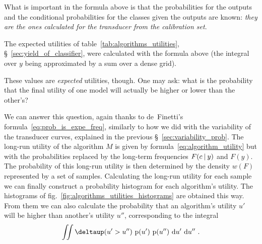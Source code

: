 \documentclass[\ifafour a4paper,12pt,\else a5paper,10pt,\fi%
onecolumn,oneside,article,%
british%
]{memoir}
\makeatletter
\newcommand*{\widefbox}[1]{\fbox{\hspace{1em}#1\hspace{1em}}}
\theoremstyle{remark}
\theoremstyle{innote}
\def\sum{\DOTSI\sumop\slimits@}
\newcommand*{\de}{\partialup}%
\newcommand*{\delt}{\deltaup}%
\newcommand*{\di}{\mathrm{d}}%
\newcommand*{\p}{\mathrm{p}}%
\renewcommand*{\|}[1][]{\nonscript\:#1\vert\nonscript\:\mathopen{}}
\newcommand*{\sect}{\S}%
\newcommand*{\fig}{fig.}%
\newcommand*{\tsum}{\mathop{\textstyle\sum}\nolimits}
\newcommand*{\wf}{w}
\makeatother
\begin{document}
What is important in the formula above is that the probabilities for the outputs and the conditional probabilities for the classes given the outputs are known: \emph{they are the ones calculated for the transducer from the calibration set}.

The expected utilities of table~\ref{tab:algorithms_utilities}, \sect~\ref{sec:yield_of_classifier}, were calculated with the formula above (the integral over $y$ being approximated by a sum over a dense grid).

\medskip

These values are \emph{expected} utilities, though. One may ask: what is the probability that the final utility of one model will actually be higher or lower than the other's?

We can answer this question, again thanks to de~Finetti's formula~\eqref{eq:prob_is_expe_freq}, similarly to how we did with the variability of the transducer curves, explained in the previous \sect~\ref{sec:variability_prob}. The long-run utility of the algorithm $M$ is given by formula~\eqref{eq:algorithm_utility} but with the probabilities replaced by the long-term frequencies $F(c\|y)$ and $F(y)$. The probability of this long-run utility is then determined by the density $\wf(F)$ represented by a set of samples. Calculating the long-run utility for each sample we can finally construct a probability histogram for each algorithm's utility. The histograms of \fig~\ref{fig:algorithms_utilities_histograms} are obtained this way. From them we can also calculate the probability that an algorithm's utility $u'$ will be higher than another's utility $u''$, corresponding to the integral
\begin{equation}
  \label{eq:compare_alg_utilities}
\iint \delt(u' > u'')\ \p(u')\ \p(u'')\ \di u'\ \di u'' \ .
\end{equation}

\end{document}

